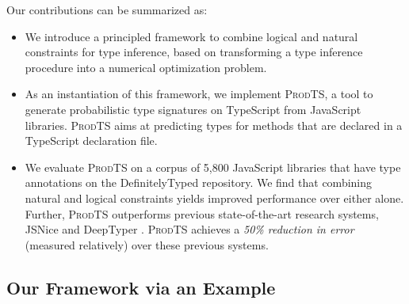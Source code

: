 \documentclass[sigplan,10pt,review,anonymous]{acmart}
\newcommand{\prodts}{\textsc{ProdTS}\xspace}
\theoremstyle{plain}
\theoremstyle{remark}
\theoremstyle{definition}
\begin{document}
Our contributions can be summarized as:
\begin{itemize}[label=\raisebox{0.25ex}{\tiny$\bullet$}]
  \item We introduce a principled framework to combine logical and natural constraints for type inference, based on transforming a type inference procedure into a numerical optimization problem.
  \item As an instantiation of this framework, we implement \prodts, a tool to generate probabilistic type signatures on
        TypeScript from JavaScript libraries. \prodts aims at predicting types for methods that are declared in a TypeScript
        declaration file.
  \item We evaluate \prodts on a corpus of 5,800 JavaScript libraries that have type annotations on
  the DefinitelyTyped repository. We find that combining natural and logical constraints
  yields improved performance over either alone.
  Further, \prodts outperforms previous state-of-the-art research systems, JSNice \cite{raychev15} and DeepTyper \cite{hellendoorn18}.
  \prodts achieves a  \emph{50\% reduction in error} (measured relatively) over these previous systems. 
\end{itemize}

\subsection{Our Framework via an Example}
\end{document}
